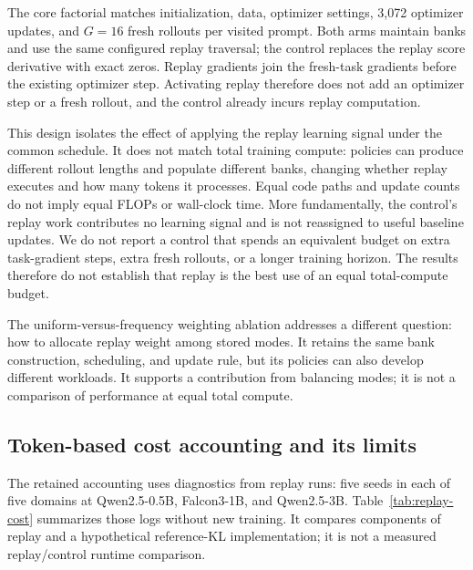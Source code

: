 \documentclass{article}
\newcommand{\1}{\mathbf 1}
\theoremstyle{remark}
\theoremstyle{definition}
\theoremstyle{plain}
\begin{document}
The core factorial matches initialization, data, optimizer settings, 3,072
optimizer updates, and $G=16$ fresh rollouts per visited prompt. Both arms
maintain banks and use the same configured replay traversal; the control
replaces the replay score derivative with exact zeros. Replay gradients join
the fresh-task gradients before the existing optimizer step. Activating
replay therefore does not add an optimizer step or a fresh rollout, and the
control already incurs replay computation.

This design isolates the effect of applying the replay learning signal under
the common schedule. It does not match total training compute: policies can
produce different rollout lengths and populate different banks, changing
whether replay executes and how many tokens it processes. Equal code paths
and update counts do not imply equal FLOPs or wall-clock time. More
fundamentally, the control's replay work contributes no learning signal and
is not reassigned to useful baseline updates. We do not report a control
that spends an equivalent budget on extra task-gradient steps, extra fresh
rollouts, or a longer training horizon. The results therefore do not establish
that replay is the best use of an equal total-compute budget.

The uniform-versus-frequency weighting ablation addresses a different
question: how to allocate replay weight among stored modes. It retains the
same bank construction, scheduling, and update rule, but its policies can
also develop different workloads. It supports a contribution from balancing
modes; it is not a comparison of performance at equal total compute.

\subsection{Token-based cost accounting and its limits}
\label{app:compute-accounting}

The retained accounting uses diagnostics from \MDcostRuns{} replay runs:
five seeds in each of five domains at Qwen2.5-0.5B, Falcon3-1B, and
Qwen2.5-3B. Table~\ref{tab:replay-cost} summarizes those logs without new
training. It compares components of replay and a hypothetical reference-KL
implementation; it is not a measured replay/control runtime comparison.
\end{document}
